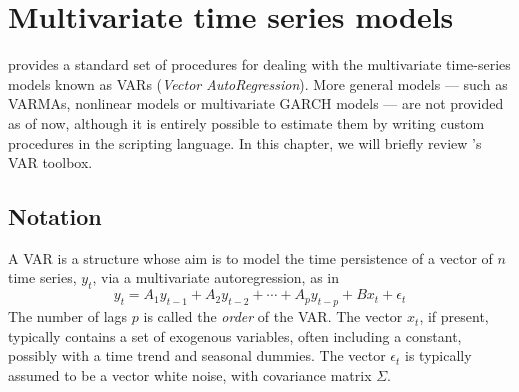 \chapter{Multivariate time series models}
\label{chap:var}

 provides a standard set of procedures for dealing with the
multivariate time-series models known as VARs (\emph{Vector
  AutoRegression}). More general models --- such as VARMAs, nonlinear
models or multivariate GARCH models --- are not provided as of now,
although it is entirely possible to estimate them by writing custom
procedures in the  scripting language. In this chapter, we
will briefly review 's VAR toolbox.

\section{Notation}
\label{sec:var-def}

A VAR is a structure whose aim is to model the time persistence of a
vector of $n$ time series, $y_t$, via a multivariate autoregression,
as in
\begin{equation}
  \label{eq:VAR}
  y_t = A_1 y_{t-1} + A_2 y_{t-2} + \cdots + A_p y_{t-p} +
  B x_t + \epsilon_t 
\end{equation}
The number of lags $p$ is called the \emph{order} of the VAR. The
vector $x_t$, if present, typically contains a set of exogenous
variables, often including a constant, possibly with a time trend and
seasonal dummies. The vector $\epsilon_t$ is typically assumed to be a
vector white noise, with covariance matrix $\Sigma$.

